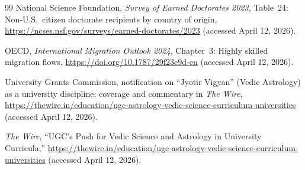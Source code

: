 \documentclass[10pt]{article}
\begin{document}
\begin{thebibliography}{99}
National Science Foundation, \textit{Survey of Earned Doctorates 2023},
Table~24: Non-U.S.\ citizen doctorate recipients by country of origin,
\url{https://ncses.nsf.gov/surveys/earned-doctorates/2023}
(accessed April 12, 2026).

OECD, \textit{International Migration Outlook 2024}, Chapter~3: Highly skilled
migration flows, \url{https://doi.org/10.1787/29f23e9d-en} (accessed April 12, 2026).

University Grants Commission, notification on ``Jyotir Vigyan'' (Vedic
Astrology) as a university discipline; coverage and commentary in
\textit{The Wire},
\url{https://thewire.in/education/ugc-astrology-vedic-science-curriculum-universities}
(accessed April 12, 2026).

\textit{The Wire}, ``UGC's Push for Vedic Science and Astrology in University
Curricula,''
\url{https://thewire.in/education/ugc-astrology-vedic-science-curriculum-universities}
(accessed April 12, 2026).

\end{thebibliography}
\end{document}
